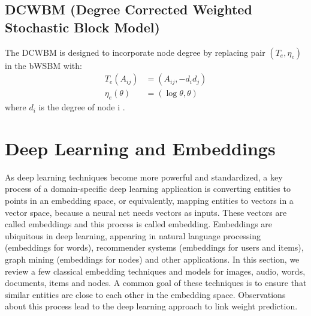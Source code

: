 \documentclass[book,12pt]{WSUThesis}
\theoremstyle{definition}
\begin{document}
\subsection{DCWBM (Degree Corrected Weighted Stochastic Block Model)}
The DCWBM is designed to incorporate node degree
by replacing pair $ (T_e, \eta_e) $ in the bWSBM with:
\begin{align*}
T_e(A_{ij}) &= (A_{ij}, -d_id_j)\\
\eta_e(\theta) &= (\log\theta, \theta)
\end{align*}
where $ d_i $ is the degree of node i \cite{aicher2014learning}.

\section{Deep Learning and Embeddings}
As deep learning techniques become more powerful and standardized,
a key process of a domain-specific deep learning application
is converting entities to points in an embedding space, or equivalently,
mapping entities to vectors in a vector space,
because a neural net needs vectors as inputs.
These vectors are called embeddings and this process is called embedding.
Embeddings are ubiquitous in deep learning,
appearing in natural language processing (embeddings for words), recommender systems (embeddings for users and items),
graph mining (embeddings for nodes) and other applications.
In this section, we review a few classical embedding techniques and models for images, audio, words, documents, items and nodes.
A common goal of these techniques is to ensure that
similar entities are close to each other in the embedding space.
Observations about this process lead to the deep learning approach to link weight prediction.
\end{document}
